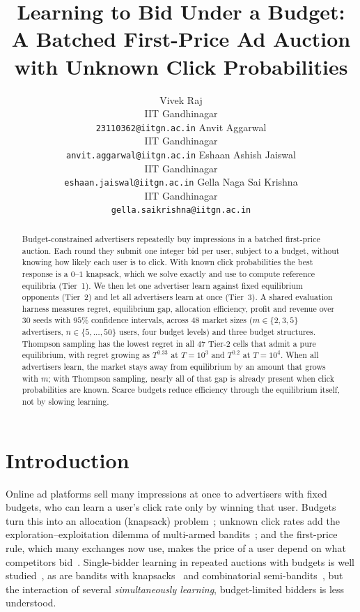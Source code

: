 \documentclass{article}
\title{Learning to Bid Under a Budget: A Batched First-Price Ad Auction with Unknown Click Probabilities}
\author{
  Vivek Raj \\ IIT Gandhinagar \\ \texttt{23110362@iitgn.ac.in} \And
  Anvit Aggarwal \\ IIT Gandhinagar \\ \texttt{anvit.aggarwal@iitgn.ac.in} \And
  Eshaan Ashish Jaiswal \\ IIT Gandhinagar \\ \texttt{eshaan.jaiswal@iitgn.ac.in} \And
  Gella Naga Sai Krishna \\ IIT Gandhinagar \\ \texttt{gella.saikrishna@iitgn.ac.in}
}
\date{}
\theoremstyle{definition}
\begin{document}
\maketitle

\begin{abstract}
Budget-constrained advertisers repeatedly buy impressions in a batched first-price auction. Each round
they submit one integer bid per user, subject to a budget, without knowing how likely each user is to
click. With known click probabilities the best response is a $0$--$1$ knapsack, which we solve exactly
and use to compute reference equilibria (Tier~1). We then let one advertiser learn against fixed
equilibrium opponents (Tier~2) and let all advertisers learn at once (Tier~3). A shared evaluation
harness measures regret, equilibrium gap, allocation efficiency, profit and revenue over $30$ seeds with
$95\%$ confidence intervals, across $48$ market sizes ($m\in\{2,3,5\}$ advertisers, $n\in\{5,\dots,50\}$
users, four budget levels) and three budget structures. Thompson sampling has the lowest regret in all
$47$ Tier-2 cells that admit a pure equilibrium, with regret growing as $T^{0.33}$ at $T=10^3$ and
$T^{0.2}$ at $T=10^4$. When all advertisers learn, the market stays away from equilibrium by an amount
that grows with $m$; with Thompson sampling, nearly all of that gap is already present when click
probabilities are known.
Scarce budgets reduce efficiency through the equilibrium itself, not by slowing learning.
\end{abstract}


\section{Introduction}\label{sec:intro}
Online ad platforms sell many impressions at once to advertisers with fixed budgets, who can learn a
user's click rate only by winning that user. Budgets turn this into an allocation
(knapsack) problem~\citep{kellerer2004knapsack}; unknown click rates add the exploration--exploitation
dilemma of multi-armed bandits~\citep{auer2002finite,lattimore2020bandit}; and the first-price rule,
which many exchanges now use, makes the price of a user depend on what competitors bid~\citep{krishna2009auction}.
Single-bidder learning in repeated auctions with budgets is well studied~\citep{balseiro2019learning,han2020optimal},
as are bandits with knapsacks~\citep{badanidiyuru2013bandits} and combinatorial semi-bandits~\citep{chen2013combinatorial},
but the interaction of several \emph{simultaneously learning}, budget-limited bidders is less understood.
\end{document}
